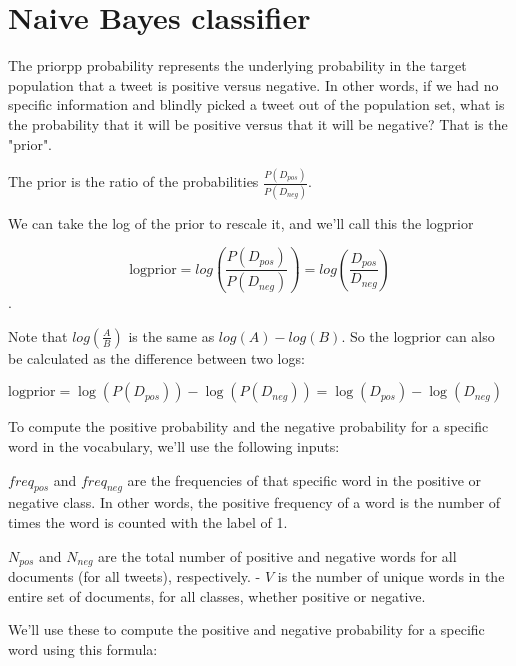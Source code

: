 \documentclass[4apaper,12pt]{book}
\begin{document}
\section{Naive Bayes classifier}
\begin{description}
\item The priorpp probability represents the underlying probability in the target population that a tweet is positive versus negative.  In other words, if we had no specific information and blindly picked a tweet out of the population set, what is the probability that it will be positive versus that it will be negative? That is the "prior".

\item The prior is the ratio of the probabilities $\frac{P(D_{pos})}{P(D_{neg})}$.
\item We can take the log of the prior to rescale it, and we'll call this the logprior

\item $$\text{logprior} = log \left( \frac{P(D_{pos})}{P(D_{neg})} \right) = log \left( \frac{D_{pos}}{D_{neg}} \right)$$.

\item Note that $log(\frac{A}{B})$ is the same as $log(A) - log(B)$.  So the logprior can also be calculated as the difference between two logs:

\item $\text{logprior} = \log (P(D_{pos})) - \log (P(D_{neg})) = \log (D_{pos}) - \log (D_{neg})$

\item To compute the positive probability and the negative probability for a specific word in the vocabulary, we'll use the following inputs:

\item $freq_{pos}$ and $freq_{neg}$ are the frequencies of that specific word in the positive or negative class. In other words, the positive frequency of a word is the number of times the word is counted with the label of 1.

\item $N_{pos}$ and $N_{neg}$ are the total number of positive and negative words for all documents (for all tweets), respectively.
- $V$ is the number of unique words in the entire set of documents, for all classes, whether positive or negative.

\item We'll use these to compute the positive and negative probability for a specific word using this formula:


\end{description}
\end{document}
